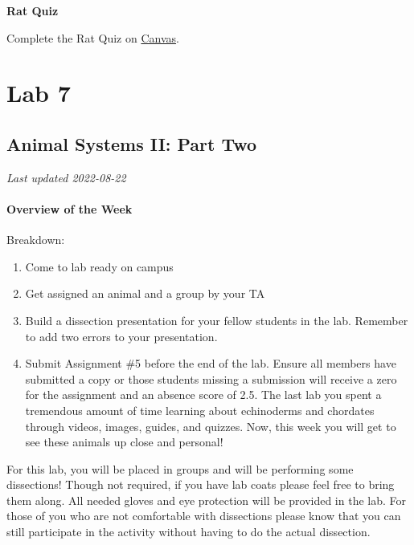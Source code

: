 \documentclass[
]{book}
\providecommand{\tightlist}{%
  \setlength{\itemsep}{0pt}\setlength{\parskip}{0pt}}
\begin{document}
\textbf{Rat Quiz}

Complete the Rat Quiz on \href{https://canvas.ubc.ca/}{Canvas}.

\hypertarget{part-lab-7}{%
\part*{Lab 7}\label{part-lab-7}}

\hypertarget{animal-systems-ii-part-two}{%
\chapter*{Animal Systems II: Part Two}\label{animal-systems-ii-part-two}}

\emph{Last updated 2022-08-22}

\hypertarget{overview-of-the-week-3}{%
\subsection*{Overview of the Week}\label{overview-of-the-week-3}}

Breakdown:

\begin{enumerate}
\def\labelenumi{\arabic{enumi}.}
\tightlist
\item
  Come to lab ready on campus
\item
  Get assigned an animal and a group by your TA
\item
  Build a dissection presentation for your fellow students in the lab. Remember to add two errors to your presentation.
\item
  Submit Assignment \#5 before the end of the lab. Ensure all members have submitted a copy or those students missing a submission will receive a zero for the assignment and an absence score of 2.5.
  The last lab you spent a tremendous amount of time learning about echinoderms and chordates through videos, images, guides, and quizzes. Now, this week you will get to see these animals up close and personal!
\end{enumerate}

For this lab, you will be placed in groups and will be performing some dissections! Though not required, if you have lab coats please feel free to bring them along. All needed gloves and eye protection will be provided in the lab. For those of you who are not comfortable with dissections please know that you can still participate in the activity without having to do the actual dissection.
\end{document}
